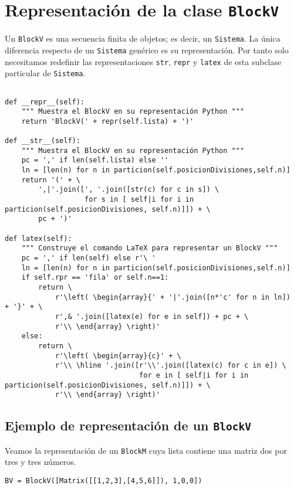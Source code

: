 \documentclass[11pt]{report}
\begin{document}
\section{Representación de la clase \texttt{BlockV}}
\label{sec:orgf1d64bd}
Un \texttt{BlockV} es una secuencia finita de objetos; es decir, un
\texttt{Sistema}.  La única diferencia respecto de un \texttt{Sistema} genérico es
su representación. Por tanto solo necesitamos redefinir las
representaciones \texttt{str}, \texttt{repr} y \texttt{latex} de esta subclase particular
de \texttt{Sistema}.

\begin{verbatim}

def __repr__(self):
    """ Muestra el BlockV en su representación Python """
    return 'BlockV(' + repr(self.lista) + ')'
                           
def __str__(self):
    """ Muestra el BlockV en su representación Python """
    pc = ',' if len(self.lista) else ''
    ln = [len(n) for n in particion(self.posicionDivisiones,self.n)]
    return '(' + \
        ',|'.join([', '.join([str(c) for c in s]) \
                   for s in [ self|i for i in particion(self.posicionDivisiones, self.n)]]) + \
        pc + ')'

def latex(self):
    """ Construye el comando LaTeX para representar un BlockV """
    pc = ',' if len(self) else r'\ '
    ln = [len(n) for n in particion(self.posicionDivisiones,self.n)]
    if self.rpr == 'fila' or self.n==1:    
        return \
            r'\left( \begin{array}{' + '|'.join([n*'c' for n in ln])  + '}' + \
            r',& '.join([latex(e) for e in self]) + pc + \
            r'\\ \end{array} \right)'
    else:
        return \
            r'\left( \begin{array}{c}' + \
            r'\\ \hline '.join([r'\\'.join([latex(c) for c in e]) \
                                for e in [ self|i for i in particion(self.posicionDivisiones, self.n)]]) + \
            r'\\ \end{array} \right)'

\end{verbatim}

\subsection{Ejemplo de representación de un \texttt{BlockV}}
\label{sec:org420f1cb}
Veamos la representación de un \texttt{BlockM} cuya lista contiene una matriz
dos por tres y tres números.
\begin{verbatim}
BV = BlockV([Matrix([[1,2,3],[4,5,6]]), 1,0,0])
\end{verbatim}
\end{document}
